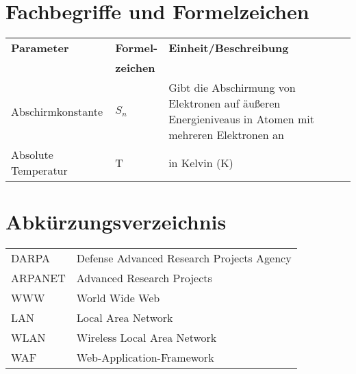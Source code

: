 \section*{Fachbegriffe und Formelzeichen}
\begin{longtable}{llp{6.5cm}}
	\textbf{Parameter} & \textbf{Formel-} & \textbf{Einheit/Beschreibung}\\
	 & \textbf{zeichen} & \\
	Abschirmkonstante & $ S_n $ & Gibt die Abschirmung von Elektronen auf äußeren Energieniveaus in Atomen mit mehreren Elektronen an\\
	Absolute Temperatur & T & in Kelvin (K)\\ 
\end{longtable}

\vspace{1cm}


\section*{Abkürzungsverzeichnis}

\begin{tabularx}{0.9\columnwidth}{lX}
	DARPA & Defense Advanced Research Projects Agency\\
	ARPANET & Advanced Research Projects\\
	WWW & World Wide Web \\
	LAN & Local Area Network \\
	WLAN & Wireless Local Area Network \\
	WAF & Web-Application-Framework \\
\end{tabularx}



	
%
